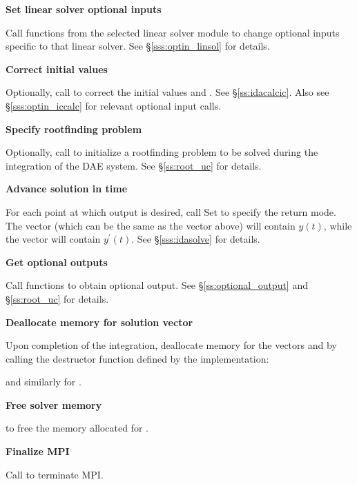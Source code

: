 \begin{Steps}
\item
  {\bf Set linear solver optional inputs}

  Call  functions from the selected linear solver module to
  change optional inputs specific to that linear solver.
  See \S\ref{sss:optin_linsol} for details.

\item 
  {\bf Correct initial values}

  Optionally, call  to correct the initial values
   and .  See \S\ref{ss:idacalcic}.
  Also see \S\ref{sss:optin_iccalc} for relevant optional input calls.

\item
  {\bf Specify rootfinding problem}

  Optionally, call  to initialize a rootfinding problem
  to be solved during the integration of the DAE system.
  See \S\ref{ss:root_uc} for details.

\item
  {\bf Advance solution in time}

  For each point at which output is desired, call
  Set  to specify the return mode.
  The vector  (which can be the same as
  the vector  above) will contain $y(t)$,
  while the vector  will contain $y^\prime(t)$.
  See \S\ref{sss:idasolve} for details.
  
\item
  {\bf Get optional outputs}

  Call  functions to obtain optional output.
  See \S\ref{ss:optional_output} and \S\ref{ss:root_uc} for details.

\item
  {\bf Deallocate memory for solution vector}

  Upon completion of the integration, deallocate memory for the vectors 
  and  by calling the destructor function defined by the {\nvector} 
  implementation:

  {\s} 

  {\p} 
  
  and similarly for .
  
\item
  {\bf Free solver memory}

   to free the memory allocated for {\ida}.
  
\item 
  {\bf {\p} Finalize MPI}
  
  Call  to terminate MPI.

\end{Steps}

